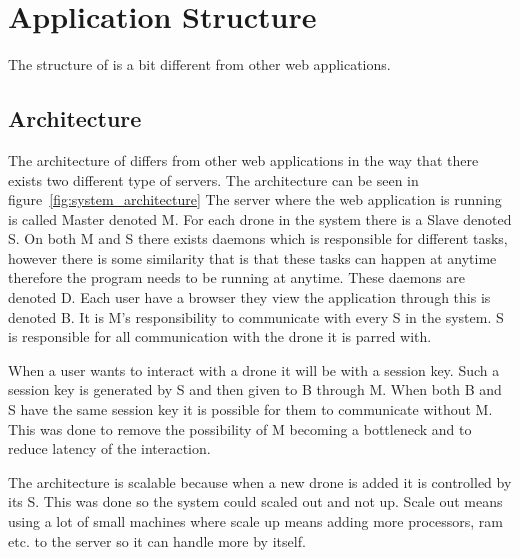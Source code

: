 \section{Application Structure}
\label{sec:application_structure}

The structure of \projectname{} is a bit different from other web applications.

\subsection{Architecture}

The architecture of \projectname{} differs from other web applications in the way that there exists two different type of servers. 
The architecture can be seen in figure~\ref{fig:system_architecture}
The server where the web application is running is called Master denoted M.
For each drone in the system there is a Slave denoted S. 
On both M and S there exists daemons which is responsible for different tasks, however there is some similarity that is that these tasks can happen at anytime therefore the program needs to be running at anytime. These daemons are denoted D.
Each user have a browser they view the application through this is denoted B.
It is M's responsibility to communicate with every S in the system.
S is responsible for all communication with the drone it is parred with.

When a user wants to interact with a drone it will be with a session key. Such a session key is generated by S and then given to B through M. When both B and S have the same session key it is possible for them to communicate without M. This was done to remove the possibility of M becoming a bottleneck and to reduce latency of the interaction.

The architecture is scalable because when a new drone is added it is controlled by its S. This was done so the system could scaled out and not up. Scale out means using a lot of small machines where scale up means adding more processors, ram etc. to the server so it can handle more by itself.

